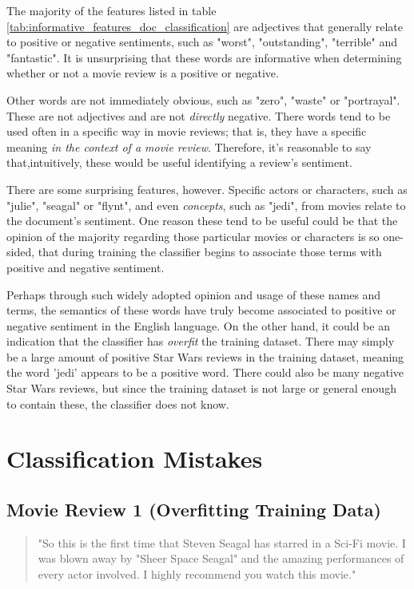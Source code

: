 \documentclass{article}
\begin{document}
The majority of the features listed in table \ref{tab:informative_features_doc_classification} are adjectives that generally relate to positive or negative sentiments, such as "worst", "outstanding", "terrible" and "fantastic". It is unsurprising that these words are informative when determining whether or not a movie review is a positive or negative.

Other words are not immediately obvious, such as "zero", "waste" or "portrayal". These are not adjectives and are not \textit{directly} negative. There words tend to be used often in a specific way in movie reviews; that is, they have a specific meaning \textit{in the context of a movie review}. Therefore, it's reasonable to say that,intuitively, these would be useful identifying a review's sentiment.

There are some surprising features, however. Specific actors or characters, such as "julie", "seagal" or "flynt", and even \textit{concepts}, such as "jedi", from movies relate to the document's sentiment. One reason these tend to be useful could be that the opinion of the majority regarding those particular movies or characters is so one-sided, that during training the classifier begins to associate those terms with positive and negative sentiment.

Perhaps through such widely adopted opinion and usage of these names and terms, the semantics of these words have truly become associated to positive or negative sentiment in the English language. On the other hand, it could be an indication that the classifier has \textit{overfit} the training dataset. There may simply be a large amount of positive Star Wars reviews in the training dataset, meaning the word 'jedi' appears to be a positive word. There could also be many negative Star Wars reviews, but since the training dataset is not large or general enough to contain these, the classifier does not know. 

\section {Classification Mistakes}

\subsection{Movie Review 1 (Overfitting Training Data)}

\begin{quote}
"So this is the first time that Steven Seagal has starred in a Sci-Fi movie. I was blown away by "Sheer Space Seagal" and the amazing performances of every actor involved. I highly recommend you watch this movie."
\end{quote}
\end{document}
